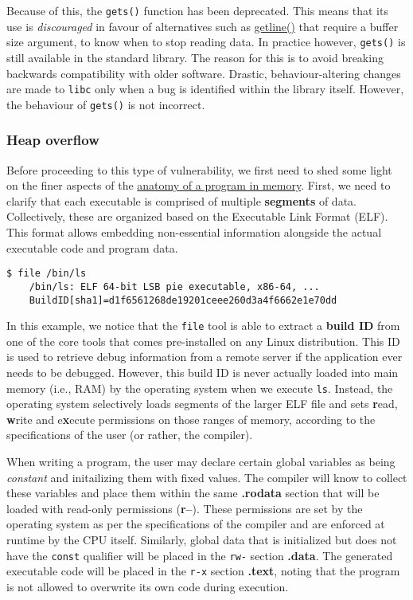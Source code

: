 Because of this, the \texttt{gets()} function has been deprecated. This means
that its use is \textit{discouraged} in favour of alternatives such as
\href{https://www.man7.org/linux/man-pages/man3/getline.3.html}{getline()}
that require a buffer size argument, to know when to stop reading data. In
practice however, \texttt{gets()} is still available in the standard library.
The reason for this is to avoid breaking backwards compatibility with older
software. Drastic, behaviour-altering changes are made to \texttt{libc} only
when a bug is identified within the library itself. However, the behaviour of
\texttt{gets()} is not incorrect.

\subsubsection{Heap overflow}

Before proceeding to this type of vulnerability, we first need to shed some
light on the finer aspects of the
\href{https://olehslabak.medium.com/linux-for-dev-4-6f89616442b7}{anatomy of a
program in memory}. First, we need to clarify that each executable is comprised
of multiple \textbf{segments} of data. Collectively, these are organized based
on the Executable Link Format (ELF). This format allows embedding non-essential
information alongside the actual executable code and program data.

\begin{lstlisting}[style=bashstyle]
$ file /bin/ls
    /bin/ls: ELF 64-bit LSB pie executable, x86-64, ...
    BuildID[sha1]=d1f6561268de19201ceee260d3a4f6662e1e70dd
\end{lstlisting}

In this example, we notice that the \texttt{file} tool is able to extract a
\textbf{build ID} from one of the core tools that comes pre-installed on any
Linux distribution. This ID is used to retrieve debug information from a
remote server if the application ever needs to be debugged. However, this
build ID is never actually loaded into main memory (i.e., RAM) by the operating
system when we execute \texttt{ls}. Instead, the operating system selectively
loads segments of the larger ELF file and sets \textbf{r}ead, \textbf{w}rite
and e\textbf{x}ecute permissions on those ranges of memory, according to the
specifications of the user (or rather, the compiler).

When writing a program, the user may declare certain global variables as being
\textit{constant} and initailizing them with fixed values. The compiler will
know to collect these variables and place them within the same \textbf{.rodata}
section that will be loaded with read-only permissions (\textbf{r--}). These
permissions are set by the operating system as per the specifications of the
compiler and are enforced at runtime by the CPU itself. Similarly, global data
that is initialized but does not have the \texttt{const} qualifier will be
placed in the \texttt{rw-} section \textbf{.data}. The generated executable code
will be placed in the \texttt{r-x} section \textbf{.text}, noting that the
program is not allowed to overwrite its own code during execution.

